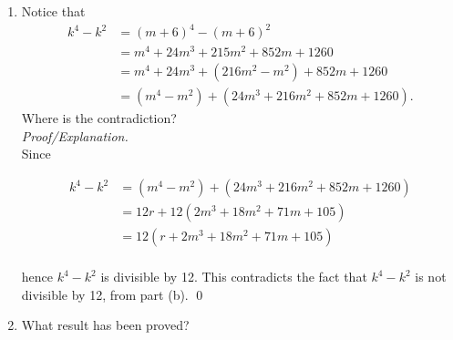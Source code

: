 \documentclass[12pt]{article}
\begin{document}
\begin{enumerate}
\begin{enumerate}
	\emph{Proof/Explanation.}
	If we suppose that $S \neq \varnothing$ and that $1 \leq m < k$ such that $k = m + 6$, then it must be true that there is an integer $r$ such that 
	
	\[m^4-m^2 = 12r.\]
	
	Also by definition of $k$ we have 
	
	\[k^4-k^2 \neq 12t \text{, for any integer } t.\] \qed
	
	\item Notice that
		\begin{align*}
		k^4 - k^2 &= (m+6)^4 - (m+6)^2 \\
		&= m^4 + 24m^3 + 215m^2 + 852 m + 1260 \\
		&= m^4 + 24m^3 + (216m^2 - m^2) + 852 m + 1260 \\
		&= (m^4 - m^2) + (24m^3 + 216m^2 + 852 m + 1260).
		\end{align*}
		Where is the contradiction? \\
	
	\emph{Proof/Explanation.} \\
	
	Since 
	
	\begin{align*}
	    k^4-k^2 &= (m^4 - m^2) + (24m^3 + 216m^2 + 852 m + 1260) \\
	    &= 12r + 12(2m^3+18m^2+71m+105) \\
	    &= 12(r + 2m^3+18m^2+71m+105)\\
	\end{align*}
	
	hence $k^4-k^2$ is divisible by 12.  This contradicts the fact that $k^4-k^2$ is not divisible by 12, from part (b). \qed \\
	

	\item What result has been proved? \\
	

\end{enumerate}
\end{enumerate}
\end{document}
